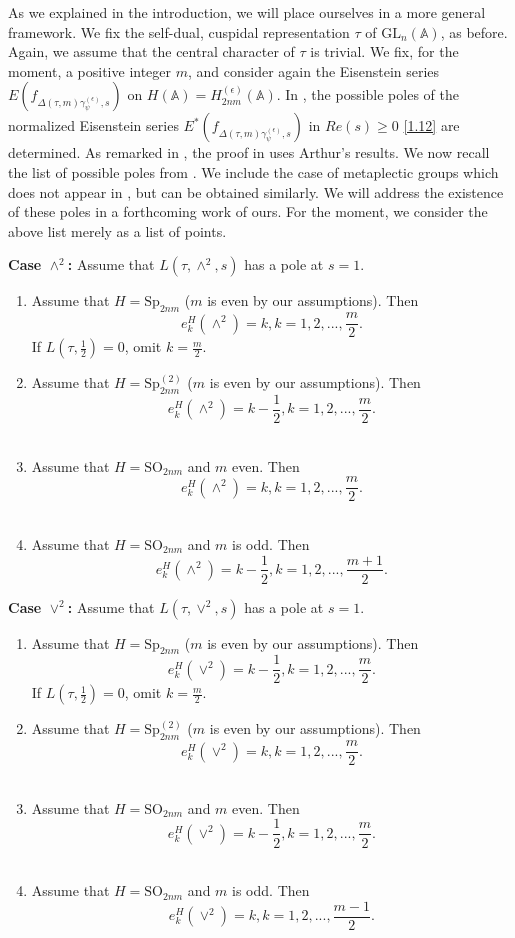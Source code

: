 \documentclass[12pts]{amsart}
\newcommand{\BA}{{\mathbb {A}}}
\newcommand{\GL}{{\mathrm{GL}}}
\newcommand{\SO}{{\mathrm{SO}}}
\newcommand{\Sp}{{\mathrm{Sp}}}
\begin{document}
As we explained in the introduction, we will place ourselves in a more general framework. We fix the self-dual, cuspidal representation $\tau$ of $\GL_n(\BA)$, as before. Again, we assume that the central character of $\tau$ is trivial. We fix, for the moment, a positive integer $m$, and consider again the Eisenstein series $E(f_{\Delta(\tau,m)\gamma^{(\epsilon)}_\psi,s})$ on $H(\BA)=H^{(\epsilon)}_{2nm}(\BA)$. In \cite{JLZ13}, the possible poles of the normalized Eisenstein series $E^*(f_{\Delta(\tau,m)\gamma^{(\epsilon)}_\psi,s})$ in $Re(s)\geq 0$ \eqref{1.12} are determined. As remarked in \cite{CFK18}, the proof in \cite{JLZ13} uses Arthur's results. We now recall the list of possible poles from \cite{JLZ13}. We include the case of metaplectic groups which does not appear in \cite{JLZ13}, but can be obtained similarly. We will address the existence of these poles in a forthcoming work of ours. For the moment, we consider the above list merely as a list of points.

{\bf Case $\wedge^2$:} Assume that $L(\tau,\wedge^2,s)$ has a pole at $s=1$.
\begin{enumerate}
	\item  Assume that $H=\Sp_{2nm}$ ($m$ is even by our assumptions). Then 
	$$
	e^H_k(\wedge^2)=k, k=1,2,...,\frac{m}{2}. 
	$$
	If $L(\tau,\frac{1}{2})=0$, omit $k=\frac{m}{2}$.\\
	\item  Assume that $H=\Sp^{(2)}_{2nm}$ ($m$ is even by our assumptions). Then 
	$$
	e^H_k(\wedge^2)=k-\frac{1}{2}, k=1,2,...,\frac{m}{2}.
	$$
	\\
	\item Assume that $H=\SO_{2nm}$ and $m$ even. Then 
	$$
	e^H_k(\wedge^2)=k, k=1,2,...,\frac{m}{2}.
	$$
	\\
	\item Assume that $H=\SO_{2nm}$ and $m$ is odd. Then  
	$$
	e^H_k(\wedge^2)=k-\frac{1}{2}, k=1,2,...,\frac{m+1}{2}.
	$$	
\end{enumerate}

{\bf Case $\vee^2$:} Assume that $L(\tau,\vee^2,s)$ has a pole at $s=1$.
\begin{enumerate}
	\item  Assume that $H=\Sp_{2nm}$ ($m$ is even by our assumptions). Then 
	$$
	e^H_k(\vee^2)=k-\frac{1}{2}, k=1,2,...,\frac{m}{2}. 
	$$
	If $L(\tau,\frac{1}{2})=0$, omit $k=\frac{m}{2}$.\\
	\item  Assume that $H=\Sp^{(2)}_{2nm}$ ($m$ is even by our assumptions). Then 
	$$
	e^H_k(\vee^2)=k, k=1,2,...,\frac{m}{2}.
	$$
	\\
	\item Assume that $H=\SO_{2nm}$ and $m$ even. Then  
	$$
	e^H_k(\vee^2)=k-\frac{1}{2}, k=1,2,...,\frac{m}{2}.
	$$
	\\
	\item Assume that $H=\SO_{2nm}$ and $m$ is odd. Then  
	$$
	e^H_k(\vee^2)=k, k=1,2,...,\frac{m-1}{2}.
	$$	
\end{enumerate}
\end{document}
